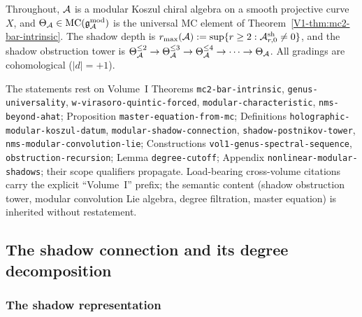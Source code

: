 Throughout, $\mathcal{A}$ is a modular Koszul chiral algebra on a
smooth projective curve~$X$, and $\Theta_{\mathcal{A}} \in \text{MC}(\mathfrak{g}_{\mathcal{A}}^{\mathrm{mod}})$ is the
universal MC element of
Theorem~\ref*{V1-thm:mc2-bar-intrinsic}. The shadow depth is
$r_{\max}(\mathcal{A}) := \sup\{r \geq 2 : \mathcal{A}^{\mathrm{sh}}_{r,0} \neq 0\}$,
and the shadow obstruction tower is
$\Theta_{\mathcal{A}}^{\leq 2} \to \Theta_{\mathcal{A}}^{\leq 3} \to
\Theta_{\mathcal{A}}^{\leq 4} \to \cdots \to \Theta_{\mathcal{A}}$.
All gradings are cohomological ($|d| = +1$).

\begin{remark}
The \ClaimStatusProvedHere{} statements rest on Volume~I
Theorems \texttt{mc2-bar-intrinsic},
\texttt{genus-universality}, \texttt{w-virasoro-quintic-forced},
\texttt{modular-characteristic}, \texttt{nms-beyond-ahat};
Proposition \texttt{master-equation-from-mc};
Definitions \texttt{holographic-modular-koszul-datum},
\texttt{modular-shadow-connection},
\texttt{shadow-postnikov-tower},
\texttt{nms-modular-convolution-lie};
Constructions \texttt{vol1-genus-spectral-sequence},
\texttt{obstruction-recursion};
Lemma \texttt{degree-cutoff};
Appendix \texttt{nonlinear-modular-shadows}; their scope qualifiers
propagate. Load-bearing cross-volume citations carry the explicit
``Volume~I'' prefix; the semantic content (shadow obstruction
tower, modular convolution Lie algebra, degree filtration, master
equation) is inherited without restatement.
\end{remark}

%
%

\subsection{The shadow connection and its degree decomposition}

\subsubsection{The shadow representation}

